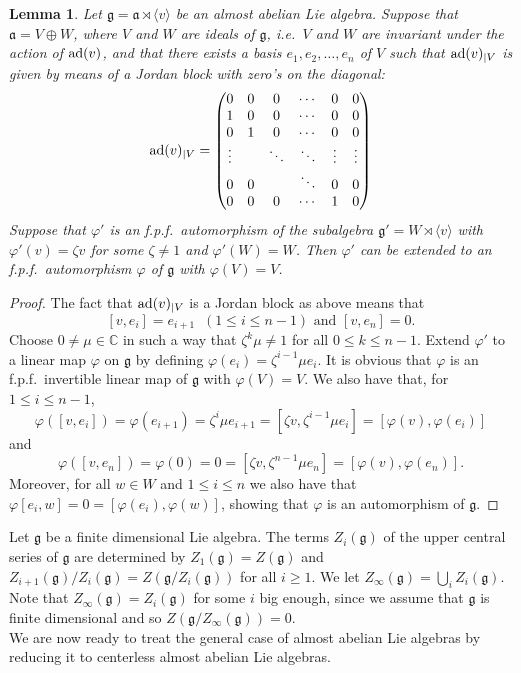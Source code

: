 \documentclass[12pt]{amsart}
\newtheorem{lem}[thm]{Lemma}
\theoremstyle{definition}
\theoremstyle{remark}
\newcommand{\C}{\mathbb{C}}
\newcommand{\ad}{{\rm ad}}
\newcommand{\La}{\mathfrak{a}}
\newcommand{\Lg}{\mathfrak{g}}
\renewcommand{\phi}{\varphi}
\begin{document}
\begin{lem}\label{extend-to-Jordan-block}
Let $\Lg= \La \rtimes \langle v \rangle$ be an almost abelian Lie algebra. Suppose that $\La = V \oplus W$, where $V$ and $W$
are ideals of $\Lg$, i.e.\,  $V$ and $W$ are invariant under the action of $\ad(v)$, and that there exists a basis 
$e_1, e_2, \ldots , e_n$ of $V$ such that $\ad(v)_{|V}$ is given by means of a Jordan block with zero's on the diagonal:
\[
\ad(v)_{|V} = \begin{pmatrix}
0 & 0 & 0 & \cdots & 0 & 0  \\
1 & 0 & 0 & \cdots & 0 & 0 \\
0 & 1 & 0 & \cdots & 0 & 0\\
\vdots &  & \ddots & \ddots & \vdots & \vdots \\
0 & 0 &   & \ddots & 0 & 0 \\
0 & 0 & 0  & \cdots & 1 & 0 \\
\end{pmatrix}
\]
Suppose that $\varphi'$ is an f.p.f.\ automorphism of the subalgebra $\Lg' = W \rtimes \langle v \rangle$ with
$\varphi'(v)= \zeta v$ for some $\zeta \neq 1$ and $\varphi'(W) = W$. Then $\varphi'$ can be extended to an
f.p.f.\ automorphism $\phi$ of $\Lg$ with $\varphi(V)=V$.
\end{lem}

\begin{proof} The fact that $\ad(v)_{|V}$ is a Jordan block as above means that 
\[
[v,e_i] = e_{i+1} \;\; (1\leq i \leq n-1) \mbox{ and } [v,e_n]=0.
\]
Choose $0\neq \mu\in \C$ in such a way that $\zeta^k\mu\neq 1$ for all $0 \leq k \leq n-1$. Extend $\varphi'$ to a linear map
$\varphi$ on $\Lg$ by defining $\varphi(e_i) = \zeta^{i-1} \mu e_i$. It is obvious that $\varphi$ is an f.p.f.\ invertible
linear map of $\Lg$ with $\varphi(V) =V$. We also have that, for $1\leq i \leq n-1$,
\[
\varphi ([v, e_i]) = \varphi (e_{i+1}) = \zeta^i \mu e_{i+1} = [ \zeta v , \zeta^{i-1} \mu e_i] = [ \varphi(v), \varphi( e_i)]
\]
and 
\[
\varphi([v,e_n]) = \varphi(0) = 0 = [\zeta v, \zeta^{n-1} \mu e _n] = [ \varphi(v) , \varphi(e_n)].
\]
Moreover, for all $w\in W$ and $1\leq i \leq n$ we also have that $\varphi[e_i, w] = 0 = [\varphi(e_i) , \varphi(w) ] $,
showing that $\varphi$ is an automorphism of $\Lg$. 
\end{proof}
Let $\Lg$ be a finite dimensional Lie algebra. The terms $Z_i(\Lg)$ of the upper central series of $\Lg$ are
determined  by  $Z_1(\Lg) = Z(\Lg)$ and $Z_{i+1}(\Lg)/Z_i(\Lg) = Z( \Lg/ Z_i(\Lg)) $ for all $i\geq 1$.
We let $Z_\infty(\Lg) = \bigcup_i Z_i(\Lg)$. Note that $Z_\infty(\Lg) = Z_i(\Lg)$ for some $i$ big enough, since we assume
that $\Lg$ is finite dimensional and so  $Z(\Lg/Z_\infty(\Lg)) =0$. \\[0.2cm]
We are now ready to treat the general case of
almost abelian Lie algebras by reducing it to centerless almost abelian Lie algebras.
\end{document}
